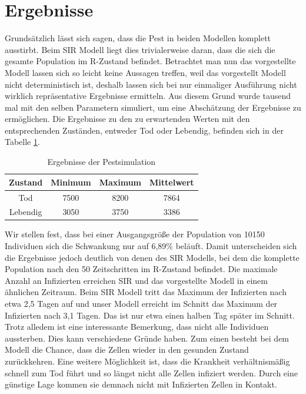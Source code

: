 \documentclass[10pt,twocolumn]{scrartcl}
\begin{document}
\section*{Ergebnisse}
Grundsätzlich lässt sich sagen, dass die Pest in beiden Modellen komplett ausstirbt. Beim SIR Modell liegt dies trivialerweise daran, dass die sich die gesamte Population im R-Zustand befindet. Betrachtet man nun das vorgestellte Modell lassen sich so leicht keine Aussagen treffen, weil das vorgestellt Modell nicht deterministisch ist, deshalb lassen sich bei nur einmaliger Ausführung nicht wirklich repräsentative Ergebnisse ermitteln. Aus diesem Grund wurde tausend mal mit den selben Parametern simuliert, um eine Abschätzung der Ergebnisse zu ermöglichen. Die Ergebnisse zu den zu erwartenden Werten mit den entsprechenden Zuständen, entweder Tod oder Lebendig, befinden sich in der Tabelle \ref{tab:ergebnisse}.
\begin{table}[H]
	\caption{Ergebnisse der Pestsimulation}
	\label{tab:ergebnisse}
	\centering
	\begin{tabular}{|c|ccc|}
		\rowcolor{dunkelgrau}
		\hline
		Zustand &	Minimum & Maximum & Mittelwert \\ \hline
		Tod & 7500 & 8200 & 7864 \\ 
	\rowcolor{grau}		Lebendig & 3050 & 3750 & 3386\\
	\hline
	\end{tabular}
\end{table}
Wir stellen fest, dass bei einer Ausgangsgröße der Population von 10150 Individuen sich die Schwankung nur auf 6,89\% beläuft. Damit unterscheiden sich die Ergebnisse jedoch deutlich von denen des SIR Modells, bei dem die komplette Population nach den 50 Zeitschritten im R-Zustand befindet. Die maximale Anzahl an Infizierten erreichen SIR und das vorgestellte Modell in einem ähnlichen Zeitraum. Beim SIR Modell tritt das Maximum der Infizierten nach etwa 2,5 Tagen auf und unser Modell erreicht im Schnitt das Maximum der Infizierten nach 3,1 Tagen. Das ist nur etwa einen halben Tag später im Schnitt.
Trotz alledem ist eine interessante Bemerkung, dass nicht alle Individuen aussterben. Dies kann verschiedene Gründe haben. Zum einen besteht bei dem Modell die Chance, dass die Zellen wieder in den gesunden Zustand zurückkehren. Eine weitere Möglichkeit ist, dass die Krankheit verhältnismäßig schnell zum Tod führt und so längst nicht alle Zellen infiziert werden. Durch eine günstige Lage kommen sie demnach nicht mit Infizierten Zellen in Kontakt.   
\end{document}
